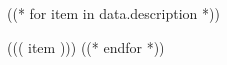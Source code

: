 \vspace{\topsep} %
\begin{tightemize}
((* for item in data.description *))
\item ((( item )))
((* endfor *))
\end{tightemize}
\sectionsep